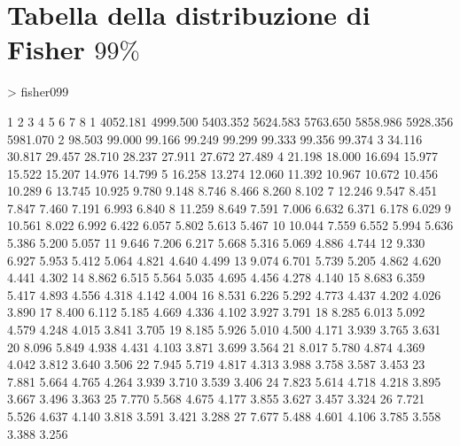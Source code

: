 \documentclass[onecolumn,11pt]{book}
\begin{document}
\section*{Tabella della distribuzione di Fisher $99\%$}
\oddsidemargin 0.0in
\evensidemargin 0.0in
\topmargin -0.4in
\begin{Schunk}
\begin{Sinput}
> fisher099
\end{Sinput}
\begin{Soutput}
           1        2        3        4        5        6        7        8
1   4052.181 4999.500 5403.352 5624.583 5763.650 5858.986 5928.356 5981.070
2     98.503   99.000   99.166   99.249   99.299   99.333   99.356   99.374
3     34.116   30.817   29.457   28.710   28.237   27.911   27.672   27.489
4     21.198   18.000   16.694   15.977   15.522   15.207   14.976   14.799
5     16.258   13.274   12.060   11.392   10.967   10.672   10.456   10.289
6     13.745   10.925    9.780    9.148    8.746    8.466    8.260    8.102
7     12.246    9.547    8.451    7.847    7.460    7.191    6.993    6.840
8     11.259    8.649    7.591    7.006    6.632    6.371    6.178    6.029
9     10.561    8.022    6.992    6.422    6.057    5.802    5.613    5.467
10    10.044    7.559    6.552    5.994    5.636    5.386    5.200    5.057
11     9.646    7.206    6.217    5.668    5.316    5.069    4.886    4.744
12     9.330    6.927    5.953    5.412    5.064    4.821    4.640    4.499
13     9.074    6.701    5.739    5.205    4.862    4.620    4.441    4.302
14     8.862    6.515    5.564    5.035    4.695    4.456    4.278    4.140
15     8.683    6.359    5.417    4.893    4.556    4.318    4.142    4.004
16     8.531    6.226    5.292    4.773    4.437    4.202    4.026    3.890
17     8.400    6.112    5.185    4.669    4.336    4.102    3.927    3.791
18     8.285    6.013    5.092    4.579    4.248    4.015    3.841    3.705
19     8.185    5.926    5.010    4.500    4.171    3.939    3.765    3.631
20     8.096    5.849    4.938    4.431    4.103    3.871    3.699    3.564
21     8.017    5.780    4.874    4.369    4.042    3.812    3.640    3.506
22     7.945    5.719    4.817    4.313    3.988    3.758    3.587    3.453
23     7.881    5.664    4.765    4.264    3.939    3.710    3.539    3.406
24     7.823    5.614    4.718    4.218    3.895    3.667    3.496    3.363
25     7.770    5.568    4.675    4.177    3.855    3.627    3.457    3.324
26     7.721    5.526    4.637    4.140    3.818    3.591    3.421    3.288
27     7.677    5.488    4.601    4.106    3.785    3.558    3.388    3.256

\end{Soutput}
\end{Schunk}
\end{document}
